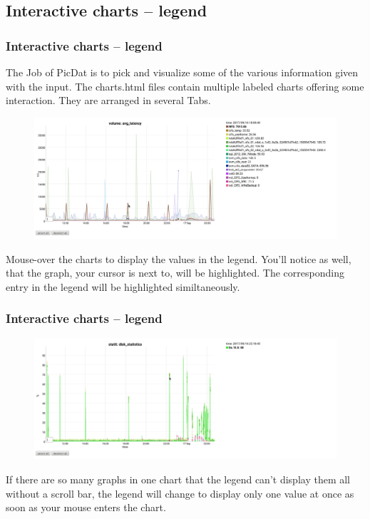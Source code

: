 \documentclass[8pt]{beamer}
\begin{document}
\subsection{Interactive charts -- legend}
\begin{frame}
\frametitle{Interactive charts -- legend}
The Job of PicDat is to pick and visualize some of the various information given with the input. The charts.html files contain multiple labeled charts offering some interaction. They are arranged in several Tabs.

\begin{figure}
	\includegraphics[width=\textwidth]{../images/PicDat_highlight2.png}
\end{figure}

Mouse-over the charts to display the values in the legend. You'll notice as well, that the graph, your cursor is next to, will be highlighted. The corresponding entry in the legend will be highlighted similtaneously.
\end{frame}

\begin{frame}
\frametitle{Interactive charts -- legend} 
\begin{figure}
	\includegraphics[width=\textwidth]{../images/PicDat_singleValue.png}
\end{figure}

If there are so many graphs in one chart that the legend can't display them all without a scroll bar, the legend will change to display only one value at once as soon as your mouse enters the chart.
\end{frame}
\end{document}
